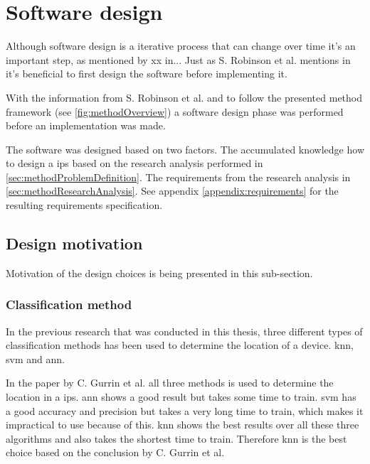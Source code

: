 \section{Software design}\label{sec:methodSoftwareDesign}
Although software design is a iterative process that can change over time it's  an important step, as mentioned by xx in...
Just as S. Robinson et al. mentions in \cite{SecretsSuccessfulSimulation1995} it's beneficial to first design the software before implementing it.
\bigskip

With the information from S. Robinson et al. and to follow the presented method framework (see \cref{fig:methodOverview}) a software design phase was performed before an implementation was made.

\bigskip

The software was designed based on two factors.
The accumulated knowledge how to design a \acrshort{ips} based on the research analysis performed in \cref{sec:methodProblemDefinition}.
The requirements from the research analysis in \cref{sec:methodResearchAnalysis}.
See appendix \ref{appendix:requirements} for the resulting requirements specification.



\subsection{Design motivation}\label{sec:methodDesignMotivation}
Motivation of the design choices is being presented in this sub-section.


\subsubsection{Classification method}\label{sec:methodSoftwareDesignClassification}
In the previous research that was conducted in this thesis, three different types of classification methods has been used to determine the location of a device.
\acrshort{knn}, \acrfull{svm} and \acrfull{ann}.

\bigskip

In the paper \cite{ComprehensiveStudyBluetooth2013} by C. Gurrin et al. all three methods is used to determine the location in a \acrshort{ips}.
\acrshort{ann} shows a good result but takes some time to train.
\acrshort{svm} has a good accuracy and precision but takes a very long time to train, which makes it impractical to use because of this.
\acrshort{knn} shows the best results over all these three algorithms and also takes the shortest time to train.
Therefore \acrshort{knn} is the best choice based on the conclusion by C. Gurrin et al.


